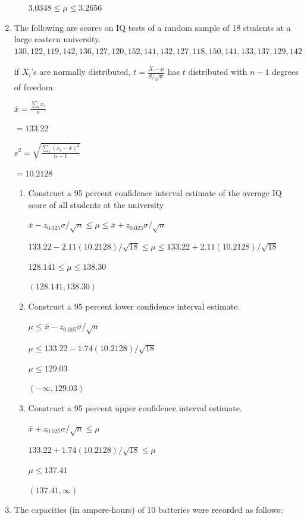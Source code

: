 \documentclass{article}
\begin{document}
\begin{enumerate}
\begin{enumerate}
        $3.0348 \leq \mu \leq 3.2656$
    \end{enumerate}

    \item  The following are scores on IQ tests of a random sample of 18 students at a large eastern university.
    $130, 122, 119, 142, 136, 127, 120, 152, 141, 132, 127, 118, 150, 141, 133, 137, 129, 142$
    
    if $X_i$'s are normally distributed, $\displaystyle t=\frac{\bar{X}-\mu}{S/\sqrt{n}}$ has $t$ distributed with $n-1$ degrees of freedom.

    $\displaystyle \bar{x} = \frac{\sum_{i}{x_i}}{n}$

    $= 133.22$
    
    $\displaystyle s^2=\sqrt{\frac{\sum_i{(x_i-\bar{x})^2}}{n-1}}$

    $= 10.2128$

    \begin{enumerate}
        \item Construct a 95 percent confidence interval estimate of the average IQ score of all students at the university
        
        $\bar{x} - z_{0.025}\sigma/\sqrt{n} \leq \mu \leq \bar{x} + z_{0.025}\sigma/\sqrt{n}$

        $133.22 - 2.11(10.2128)/\sqrt{18} \leq \mu \leq 133.22 + 2.11(10.2128)/\sqrt{18}$

        $128.141 \leq \mu \leq 138.30$

        $(128.141, 138.30)$
        \item Construct a 95 percent lower confidence interval estimate.
        
        $\mu \leq \bar{x} - z_{0.005}\sigma/\sqrt{n}$

        $\mu \leq 133.22 - 1.74(10.2128)/\sqrt{18}$

        $\mu \leq 129.03$

        $(-\infty, 129.03)$
        \item Construct a 95 percent upper confidence interval estimate.
        
        $\bar{x} + z_{0.025}\sigma/\sqrt{n} \leq \mu$

        $133.22 + 1.74(10.2128)/\sqrt{18} \leq \mu$

        $\mu \leq 137.41$

        $(137.41, \infty)$
    \end{enumerate}
    \item The capacities (in ampere-hours) of 10 batteries were recorded as follows:
    

\end{enumerate}
\end{document}
